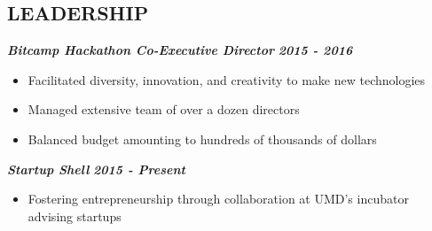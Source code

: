 \documentclass{res}
\begin{document}
\begin{resume}
\section{LEADERSHIP}
  	{\bfseries {\em Bitcamp Hackathon Co-Executive Director}} \hfill {\bfseries {\em 2015 - 2016}} \
		\begin{itemize} \itemsep -2pt %
		\item Facilitated diversity, innovation, and creativity to make new technologies
		\item Managed extensive team of over a dozen directors
		\item Balanced budget amounting to hundreds of thousands of dollars
		\end{itemize}
	{\bfseries {\em Startup Shell}} \hfill {\bfseries {\em 2015 - Present}} \
		\begin{itemize} \itemsep -2pt %
		\item Fostering entrepreneurship through collaboration at UMD's incubator advising startups
		\end{itemize}

\end{resume}
\end{document}
